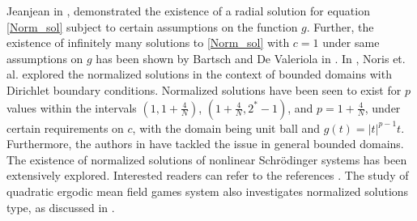 \documentclass[11pt]{article}
\numberwithin{equation}{section}
\numberwithin{mytheorem}{section}
\begin{document}
	Jeanjean in \cite{jeanjean1997existence}, demonstrated the existence of a radial solution for equation \eqref{Norm_sol} subject to certain assumptions on the function $g$. 
	Further, the existence of infinitely many solutions to \eqref{Norm_sol} with $c=1$ under same assumptions on $g$ has been shown by Bartsch and De Valeriola in \cite{bartsch2012normalized}.
	In \cite{noris2015existence}, Noris et. al. explored the normalized solutions in the context of bounded domains with Dirichlet boundary conditions. Normalized solutions have been seen to exist for $p$ values within the intervals $(1,1+\frac{4}{N})$, $(1+\frac{4}{N}, 2^*-1)$, and $p=1+\frac{4}{N}$, under certain requirements on $c$, with the domain being unit ball and $g(t)=|t|^{p-1}t$. Furthermore, the authors in \cite{pierotti2017normalized} have tackled the issue in general bounded domains.  The existence of normalized solutions of nonlinear Schrödinger systems has been extensively explored. Interested readers can refer to the references \cite{gou2018multiple, bartsch2016normalized, bartsch2018normalized, bartsch2019multiple, noris2014stable, noris2019normalized}. The study of quadratic ergodic mean field games system also investigates normalized solutions type, as discussed in \cite{pellacci2021normalized}.
	
\end{document}
